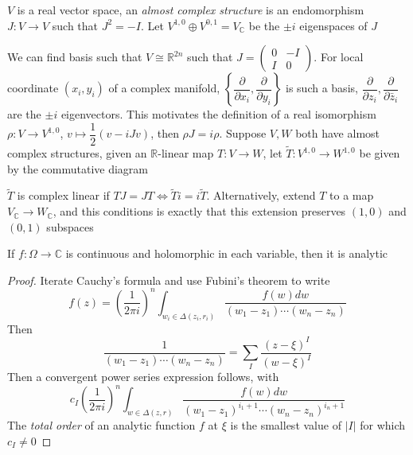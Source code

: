 \documentclass[../main.tex]{subfiles}
\begin{document}
\begin{definition}
$V$ is a real vector space, an \textit{almost complex structure} is an endomorphism $J:V\to V$ such that $J^2=-I$. Let $V^{1,0}\oplus V^{0,1}=V_{\mathbb C}$ be the $\pm i$ eigenspaces of $J$
\end{definition}

\begin{proposition}
We can find basis such that $V\cong \mathbb R^{2n}$ such that $J=\begin{pmatrix}
0&-I\\
I&0
\end{pmatrix}$. For local coordinate $(x_i,y_i)$ of a complex manifold, $\left\{\dfrac{\partial}{\partial x_i},\dfrac{\partial}{\partial y_i}\right\}$ is such a basis, $\dfrac{\partial}{\partial z_i},\dfrac{\partial}{\partial \bar z_i}$ are the $\pm i$ eigenvectors. This motivates the definition of a real isomorphism $\rho:V\to V^{1,0}$, $v\mapsto\dfrac{1}{2}(v-iJv)$, then $\rho J=i\rho$. Suppose $V,W$ both have almost complex structures, given an $\mathbb R$-linear map $T:V\to W$, let $\tilde T:V^{1,0}\to W^{1,0}$ be given by the commutative diagram
\begin{center}
\end{center}
$\tilde T$ is complex linear if $TJ=JT\iff\tilde T i=i\tilde T$. Alternatively, extend $T$ to a map $V_{\mathbb C}\to W_{\mathbb C}$, and this conditions is exactly that this extension preserves $(1,0)$ and $(0,1)$ subspaces
\end{proposition}

\begin{lemma}
If $f:\Omega\to\mathbb C$ is continuous and holomorphic in each variable, then it is analytic
\end{lemma}

\begin{proof}
Iterate Cauchy's formula and use Fubini's theorem to write
\[f(z)=\left(\frac{1}{2\pi i}\right)^n\int_{w_i\in\Delta(z_i,r_i)}\frac{f(w)dw}{(w_1-z_1)\cdots(w_n-z_n)}\]
Then
\[\frac{1}{(w_1-z_1)\cdots(w_n-z_n)}=\sum_I\frac{(z-\xi)^I}{(w-\xi)^I}\]
Then a convergent power series expression follows, with
\[c_I\left(\frac{1}{2\pi i}\right)^n\int_{w\in\Delta(z,r)}\frac{f(w)dw}{(w_1-z_1)^{i_1+1}\cdots(w_n-z_n)^{i_n+1}}\]
The \textit{total order} of an analytic function $f$ at $\xi$ is the smallest value of $|I|$ for which $c_I\neq0$
\end{proof}
\end{document}
